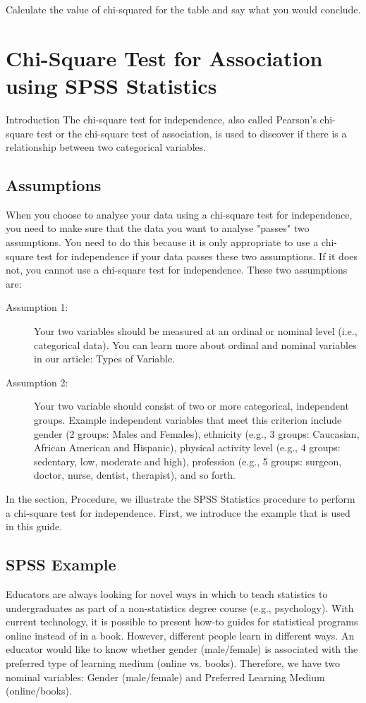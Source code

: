 \documentclass[]{report}
\begin{document}
Calculate the value of chi-squared for the table and say what you
would conclude.




\section{Chi-Square Test for Association using SPSS Statistics}

Introduction
The chi-square test for independence, also called Pearson's chi-square test or the chi-square test of association, is used to discover if there is a relationship between two categorical variables.


\subsection{Assumptions}
When you choose to analyse your data using a chi-square test for independence, you need to make sure that the data you want to analyse "passes" two assumptions. You need to do this because it is only appropriate to use a chi-square test for independence if your data passes these two assumptions. If it does not, you cannot use a chi-square test for independence. These two assumptions are:

\begin{description}
	\item[Assumption 1:] Your two variables should be measured at an ordinal or nominal level (i.e., categorical data). You can learn more about ordinal and nominal variables in our article: Types of Variable.
	\item[Assumption 2:] Your two variable should consist of two or more categorical, independent groups. Example independent variables that meet this criterion include gender (2 groups: Males and Females), ethnicity (e.g., 3 groups: Caucasian, African American and Hispanic), physical activity level (e.g., 4 groups: sedentary, low, moderate and high), profession (e.g., 5 groups: surgeon, doctor, nurse, dentist, therapist), and so forth.
\end{description}
In the section, Procedure, we illustrate the SPSS Statistics procedure to perform a chi-square test for independence. First, we introduce the example that is used in this guide.


\subsection{SPSS Example}
Educators are always looking for novel ways in which to teach statistics to undergraduates as part of a non-statistics degree course (e.g., psychology). With current technology, it is possible to present how-to guides for statistical programs online instead of in a book. However, different people learn in different ways. An educator would like to know whether gender (male/female) is associated with the preferred type of learning medium (online vs. books). Therefore, we have two nominal variables: Gender (male/female) and Preferred Learning Medium (online/books).
\end{document}
